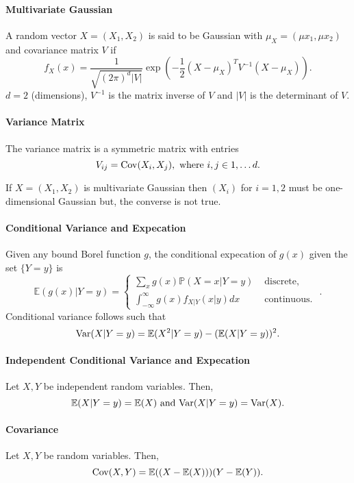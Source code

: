 \paragraph{Multivariate Gaussian}
A random vector \(X = (X_1, X_2)\) is said to be Gaussian with
 \(\mu_X = (\mu x_1, \mu x_2)\) and covariance matrix \(V\) if
  \[
     f_X(x) = \frac{1}{\sqrt{(2\pi)^d |V|}}
     \exp \left( -\frac{1}{2} (X-\mu_X)^T V^{-1}(X- \mu_X) \right) 
 .\]
 \(d = 2\) (dimensions),  \(V^{-1}\) is the matrix inverse of  \(V\)
 and  \(|V|\) is the determinant of  \(V\).

 \paragraph{Variance Matrix}
 The variance matrix is a symmetric matrix with entries \[
     V_{ij} = \mathrm{Cov}(X_i, X_j), \text{ where } i, j \in 1, \ldots d
 .\]

 If \(X = (X_1, X_2)\) is multivariate Gaussian then  \((X_i)\)
 for  \(i = 1, 2\) must be one-dimensional Gaussian but, the converse is
 not true.
 

\paragraph{Conditional Variance and Expecation}
Given any bound Borel function \(g\), the conditional expecation of  \(g(x)\)
given the set  \(\{Y = y\} \) is \[
    \mathbb{E}(g(x) | Y = y)
    = \begin{cases}
        \sum_{x} g(x) \mathbb{P}(X = x | Y = y) & \text{ discrete, } \\
        \int_{-\infty}^{\infty}  g(x) f_{X | Y} (x | y) dx
            & \text{ continuous. }
    \end{cases}
.\]
Conditional variance follows such that  \[
    \mathrm{Var}(X | Y = y)
    =
    \mathbb{E}(X^2 | Y = y) - ( \mathbb{E}(X | Y = y) )^2
.\]

\paragraph{Independent Conditional Variance and Expecation}
Let \(X, Y\) be independent random variables. Then,  \[
    \mathbb{E}(X | Y = y) = \mathbb{E}(X)
    \text{ and }
    \mathrm{Var}(X | Y = y) = \mathrm{Var}(X)
.\] 

\paragraph{Covariance}
Let \(X, Y\) be random variables. Then,  \[
    \mathrm{Cov}(X, Y) =
    \mathbb{E}((X - \mathbb{E}(X))) (Y - \mathbb{E}(Y))
.\]


